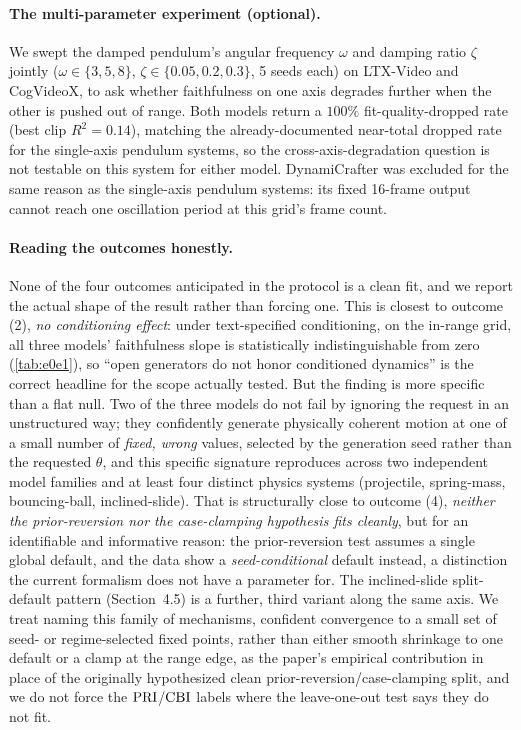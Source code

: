 \documentclass[10pt,twocolumn,letterpaper]{article}
\begin{document}
\paragraph{The multi-parameter experiment (optional).}
We swept the damped pendulum's angular frequency $\omega$ and damping
ratio $\zeta$ jointly ($\omega\in\{3,5,8\}$, $\zeta\in\{0.05,0.2,0.3\}$, 5
seeds each) on LTX-Video and CogVideoX, to ask whether faithfulness on one
axis degrades further when the other is pushed out of range. Both models
return a $100\%$ fit-quality-dropped rate (best clip $R^2=0.14$), matching
the already-documented near-total dropped rate for the single-axis
pendulum systems, so the cross-axis-degradation question is not testable
on this system for either model. DynamiCrafter was excluded for the same
reason as the single-axis pendulum systems: its fixed 16-frame output
cannot reach one oscillation period at this grid's frame count.

\paragraph{Reading the outcomes honestly.}
None of the four outcomes anticipated in the protocol is a clean fit, and we
report the actual shape of the result rather than forcing one. This is
closest to outcome (2), \emph{no conditioning effect}: under text-specified conditioning, on the
in-range grid, all three models' faithfulness slope is statistically
indistinguishable from zero (\autoref{tab:e0e1}), so ``open generators do not
honor conditioned dynamics'' is the correct headline for the scope actually
tested. But the finding is more specific than a flat null. Two of the three
models do not fail by ignoring the request in an unstructured way; they
confidently generate physically coherent motion at one of a small number of
\emph{fixed, wrong} values, selected by the generation seed rather than the
requested $\theta$, and this specific signature reproduces across two
independent model families and at least four distinct physics systems
(projectile, spring-mass, bouncing-ball, inclined-slide). That is structurally
close to outcome (4), \emph{neither the prior-reversion nor the case-clamping
hypothesis fits cleanly}, but for an
identifiable and informative reason: the prior-reversion test assumes a single
global default, and the data show a \emph{seed-conditional} default instead,
a distinction the current formalism does not have a parameter for. The
inclined-slide split-default pattern (Section~4.5) is a further, third
variant along the same axis. We treat naming this family of mechanisms,
confident convergence to a small set of seed- or regime-selected fixed
points, rather than either smooth shrinkage to one default or a clamp at the
range edge, as the paper's empirical contribution in place of the
originally hypothesized clean prior-reversion/case-clamping split, and we do not force the
$\mathrm{PRI}$/$\mathrm{CBI}$ labels where the leave-one-out test says they do not fit.
\end{document}
